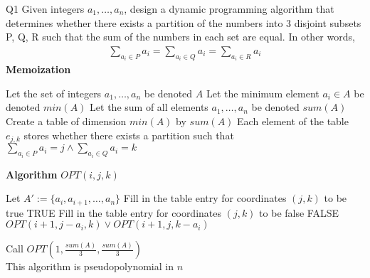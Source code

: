 \begin{problem}
  {Q1}
  Given integers $a_1, \dots , a_n$, design a dynamic programming algorithm that determines
  whether there exists a partition of the numbers into 3 disjoint subsets P, Q, R such that the sum
  of the numbers in each set are equal. In other words,
  \begin{align*}
      \sum_{a_i \in P} a_i = \sum_{a_i \in Q} a_i = \sum_{a_i \in R} a_i
  \end{align*}
  \noindent
  \textbf{Memoization}
  \begin{algorithmic}[1]
    \STATE Let the set of integers $a_1, \dots, a_n$ be denoted $A$
    \STATE Let the minimum element $a_i \in A$ be denoted $min(A)$
    \STATE Let the sum of all elements $a_1, \dots, a_n$ be denoted $sum(A)$
    \STATE Create a table of dimension $min(A)$ by $sum(A)$
    \STATE Each element of the table $e_{j, k}$ stores whether there exists a partition such that
           $\sum_{a_i \in P} a_i = j \land \sum_{a_i \in Q} a_i = k$
  \end{algorithmic}
  \noindent
  \textbf{Algorithm}
  $OPT(i, j, k)$
  \begin{algorithmic}[1]
    \STATE Let $A' := \{a_i, a_{i+1}, \dots, a_n\}$
    \STATE Fill in the table entry for coordinates $(j, k)$ to be true
    \RETURN TRUE
    \STATE Fill in the table entry for coordinates $(j, k)$ to be false
    \RETURN FALSE
    \ENDIF
    \RETURN $OPT(i+1, j-a_i, k) \lor OPT(i+1, j, k-a_i)$
  \end{algorithmic}
  Call $OPT(1, \frac{sum(A)}{3}, \frac{sum(A)}{3})$ \\
  This algorithm is pseudopolynomial in $n$ \\
\end{problem}
